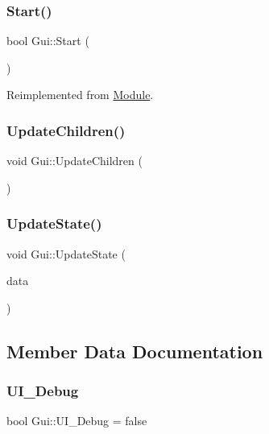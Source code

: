 \subsubsection{\texorpdfstring{Start()}{Start()}}
{\footnotesize\ttfamily bool Gui\+::\+Start (\begin{DoxyParamCaption}{ }\end{DoxyParamCaption})\hspace{0.3cm}{\ttfamily [virtual]}}



Reimplemented from \mbox{\hyperlink{class_module_aaf67046743296e8de310039a1dc95d86}{Module}}.

\mbox{\label{class_gui_a2e8ad76d16dbdf87bc4f2a77dc759613}} 
\subsubsection{\texorpdfstring{UpdateChildren()}{UpdateChildren()}}
{\footnotesize\ttfamily void Gui\+::\+Update\+Children (\begin{DoxyParamCaption}{ }\end{DoxyParamCaption})}

\mbox{\label{class_gui_a8b39af1511a827ff4d3d4dbdd4cb7576}} 
\subsubsection{\texorpdfstring{UpdateState()}{UpdateState()}}
{\footnotesize\ttfamily void Gui\+::\+Update\+State (\begin{DoxyParamCaption}\item[{\mbox{\hyperlink{class_u_i___element}{U\+I\+\_\+\+Element}} $\ast$}]{data }\end{DoxyParamCaption})}



\subsection{Member Data Documentation}
\mbox{\label{class_gui_a0bbff076275c1bb854048a0048d5eeeb}} 
\subsubsection{\texorpdfstring{UI\_Debug}{UI\_Debug}}
{\footnotesize\ttfamily bool Gui\+::\+U\+I\+\_\+\+Debug = false}



